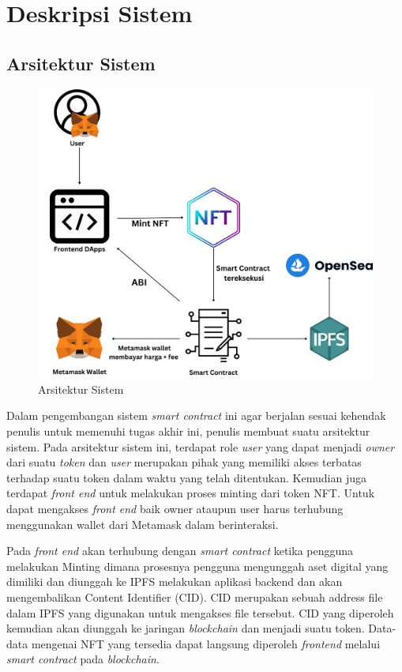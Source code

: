 \section{Deskripsi Sistem}
\subsection{Arsitektur Sistem}
\begin{figure} [H] \centering
  \includegraphics[scale=0.17]{gambar/desain_sistem_new.png}
  \caption{Arsitektur Sistem}
  \label{fig:flowtransaksi}
\end{figure}

Dalam pengembangan sistem \emph{smart contract} ini agar berjalan sesuai kehendak penulis untuk memenuhi tugas akhir ini, penulis membuat suatu arsitektur sistem. Pada arsitektur sistem ini, terdapat role \emph{user} yang dapat menjadi \emph{owner} dari suatu \emph{token} dan \emph{user} merupakan pihak yang memiliki akses terbatas terhadap suatu token dalam waktu yang telah ditentukan. Kemudian juga terdapat \emph{front end} untuk melakukan proses minting dari token NFT. Untuk dapat mengakses \emph{front end} baik owner ataupun user harus terhubung menggunakan wallet dari Metamask dalam berinteraksi.

Pada \emph{front end} akan terhubung dengan \emph{smart contract} ketika pengguna melakukan Minting dimana prosesnya pengguna mengunggah aset digital yang dimiliki dan diunggah ke IPFS melakukan aplikasi backend dan akan mengembalikan Content Identifier (CID). CID merupakan sebuah address file dalam IPFS yang digunakan untuk mengakses file tersebut. CID yang diperoleh kemudian akan diunggah ke jaringan \emph{blockchain} dan menjadi suatu token. Data-data mengenai NFT yang tersedia dapat langsung diperoleh \emph{frontend} melalui \emph{smart contract} pada \emph{blockchain}. 


